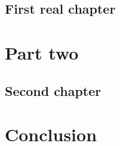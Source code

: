 \documentclass[english,BCOR=5mm,DIV=12,fontsize=10pt]{book}
\begin{document}
\chapter{First real chapter}
\label{ch:1}
    

\part{Part two}
\label{part:2}

\chapter{Second chapter}
\label{ch:2}
    


\part{Conclusion}


\appendix


\nocite{*} %



\end{document}

